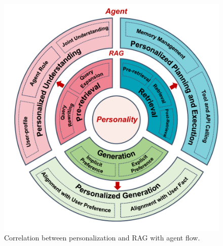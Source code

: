 \begin{figure}[t]
    \centering
    \includegraphics[width = 0.6\linewidth]{figures/structure.pdf}
    \caption{Correlation between personalization and RAG with agent flow.}
    \label{fig:structure}
\end{figure}


